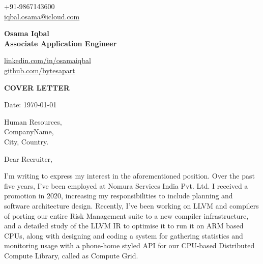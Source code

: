 \documentclass[11pt,a4paper]{article}
\begin{document}

\begin{center}
    \begin{minipage}[b]{0.24\textwidth}
            \large +91-9867143600 \\
            \large \href{mailto:iqbal.osama@icloud.com}{iqbal.osama@icloud.com} 
    \end{minipage}%
    \begin{minipage}[b]{0.5\textwidth}
            \centering
            {\Huge \textbf{Osama Iqbal}} \\ 
            \vspace{0.1cm}
            {\color{CarianBlue}\Large{\textbf{Associate Application Engineer}}}
    \end{minipage}%
    \begin{minipage}[b]{0.28\textwidth}
            \flushright \large
            {\href{https://www.linkedin.com/in/osamaiqbal/}{linkedin.com/in/osamaiqbal} } \\
            \href{https://github.com/bytesapart}{github.com/bytesapart}
    \end{minipage}   
    
\vspace{-0.15cm} 
{\color{CarianBlue} \hrulefill}
\end{center}

\justify
\setlength{\parindent}{0pt}
\setlength{\parskip}{12pt}
\vspace{0.2cm}
\begin{center}
  {\color{CarianBlue} \Large{\textbf{COVER LETTER}}}
\end{center}


Date: \today \par \vspace{-0.1cm}

Human Resources, \\
CompanyName, \\
City, Country.


Dear Recruiter,  %

I'm writing to express my interest in the aforementioned position. Over the past five years, I've been employed at Nomura Services India Pvt. Ltd. I received a promotion in 2020, increasing my responsibilities to include planning and software architecture design. Recently, I've been working on LLVM and compilers of porting our entire Risk Management suite to a new compiler infrastructure, and a detailed study of the LLVM IR to optimise it to run it on ARM based CPUs, along with designing and coding a system for gathering statistics and monitoring usage with a phone-home styled API for our CPU-based Distributed Compute Library, called as Compute Grid. \par
 
\end{document}
